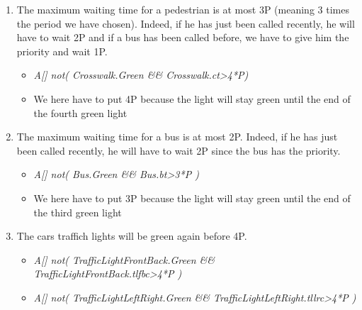\begin{enumerate}
  \item The maximum waiting time for a pedestrian is at most 3P (meaning 3 times the period we have chosen). Indeed, if he has just been called recently, he will have to wait 2P and if a bus has been called before, we have to give him the priority and wait 1P.
  \begin{itemize}
    \item \textit{A[] not( Crosswalk.Green \&\& Crosswalk.ct>4*P)}
    \item We here have to put 4P because the light will stay green until the end of the fourth green light
  \end{itemize}
  \item The maximum waiting time for a bus is at most 2P. Indeed, if he has just been called recently, he will have to wait 2P since the bus has the priority.
  \begin{itemize}
    \item \textit{A[] not( Bus.Green \&\& Bus.bt>3*P )}
    \item We here have to put 3P because the light will stay green until the end of the third green light
  \end{itemize}
  \item The cars traffich lights will be green again before 4P.
  \begin{itemize}
    \item \textit{A[] not( TrafficLightFrontBack.Green \&\& TrafficLightFrontBack.tlfbc>4*P )}
    \item \textit{A[] not( TrafficLightLeftRight.Green \&\& TrafficLightLeftRight.tllrc>4*P )}
  \end{itemize}
\end{enumerate}

